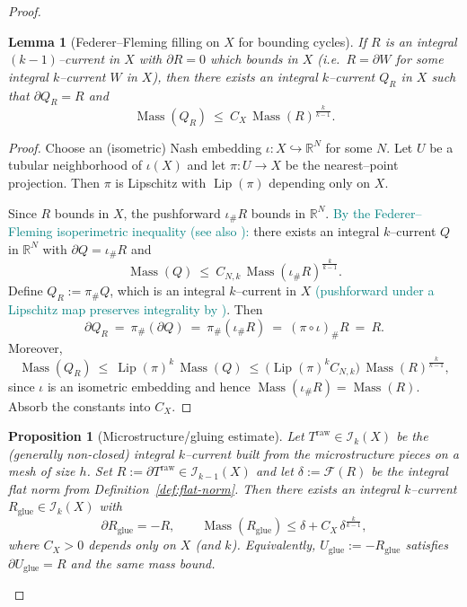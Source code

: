 \documentclass[11pt]{article}
\newcommand{\REVMZ}[1]{\textcolor{teal}{#1}}  %
\numberwithin{equation}{section}  %
\theoremstyle{plain}
\newtheorem{lemma}[theorem]{Lemma}
\newtheorem{proposition}[theorem]{Proposition}
\theoremstyle{definition}
\theoremstyle{remark}
\DeclareMathOperator{\Lip}{Lip}
\newcommand{\R}{\mathbb{R}}
\DeclareMathOperator{\Mass}{Mass}
\begin{document}
\begin{proof}
\begin{lemma}[Federer--Fleming filling on $X$ for bounding cycles]
\smallskip\noindent
If $R$ is an integral $(k-1)$--current in $X$ with $\partial R=0$ which bounds in $X$
(i.e.\ $R=\partial W$ for some integral $k$--current $W$ in $X$), then there exists an integral $k$--current $Q_R$ in $X$
such that $\partial Q_R=R$ and
\[
\Mass(Q_R)\ \le\ C_X\,\Mass(R)^{\frac{k}{k-1}}.
\]
\end{lemma}

\begin{proof}
Choose an (isometric) Nash embedding $\iota:X\hookrightarrow \R^N$ for some $N$.
Let $U$ be a tubular neighborhood of $\iota(X)$ and let $\pi:U\to X$ be the nearest--point projection.
Then $\pi$ is Lipschitz with $\Lip(\pi)$ depending only on $X$.

Since $R$ bounds in $X$, the pushforward $\iota_\# R$ bounds in $\R^N$.
\REVMZ{By the Federer--Fleming isoperimetric inequality \cite[Thm~6.1]{FF60} (see also \cite[Thm~4.2.10]{Fed69}):}
there exists an integral $k$--current $Q$ in $\R^N$ with $\partial Q=\iota_\# R$ and
\[
\Mass(Q)\ \le\ C_{N,k}\,\Mass(\iota_\# R)^{\frac{k}{k-1}}.
\]
Define $Q_R:=\pi_\# Q$, which is an integral $k$--current in $X$ \REVMZ{(pushforward under a Lipschitz map preserves integrality by \cite[Thm~4.1.14]{Fed69})}.
Then
\[
\partial Q_R\ =\ \pi_\#(\partial Q)\ =\ \pi_\#(\iota_\# R)\ =\ (\pi\circ \iota)_\# R\ =\ R.
\]
Moreover,
\[
\Mass(Q_R)\ \le\ \Lip(\pi)^k\,\Mass(Q)
\ \le\ \bigl(\Lip(\pi)^k C_{N,k}\bigr)\,\Mass(R)^{\frac{k}{k-1}},
\]
since $\iota$ is an isometric embedding and hence $\Mass(\iota_\# R)=\Mass(R)$.
Absorb the constants into $C_X$.
\end{proof}






\begin{proposition}[Microstructure/gluing estimate]\label{prop:glue-gap}\label{prop:glue-cell}
Let $T^{\mathrm{raw}}\in \mathcal I_k(X)$ be the (generally non-closed) integral $k$--current built from the microstructure pieces on a mesh of size $h$.
Set $R:=\partial T^{\mathrm{raw}}\in \mathcal I_{k-1}(X)$ and let $\delta:=\mathcal F(R)$ be the \emph{integral flat norm} from Definition~\ref{def:flat-norm}.
Then there exists an integral $k$--current $R_{\mathrm{glue}}\in\mathcal I_k(X)$ with
\[
\partial R_{\mathrm{glue}}=-R,\qquad
\Mass(R_{\mathrm{glue}})\le \delta + C_X\,\delta^{\frac{k}{k-1}},
\]
where $C_X>0$ depends only on $X$ (and $k$).
Equivalently, $U_{\mathrm{glue}}:=-R_{\mathrm{glue}}$ satisfies $\partial U_{\mathrm{glue}}=R$ and the same mass bound.
\end{proposition}



\end{proof}
\end{document}
